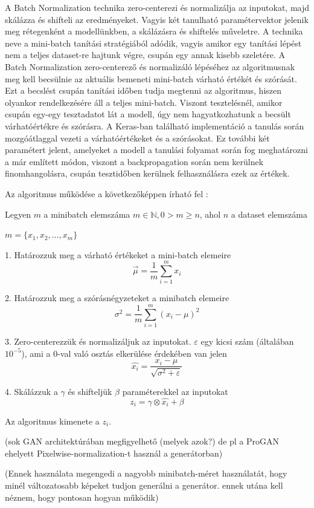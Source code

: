 A Batch Normalization technika zero-centerezi és normalizálja az inputokat, majd skálázza és shifteli az eredményeket. Vagyis két tanulható paramétervektor jelenik meg rétegenként a modellünkben, a skálázásra és shiftelés műveletre. A technika neve a mini-batch tanítási stratégiából adódik, vagyis amikor egy tanítási lépést nem a teljes dataset-re hajtunk végre, csupán egy annak kisebb szeletére. A Batch Normalization zero-centerező és normalizáló lépéséhez az algoritmusnak meg kell becsülnie az aktuális bemeneti mini-batch várható értékét és szórását. Ezt a becslést csupán tanítási időben tudja megtenni az algoritmus, hiszen olyankor rendelkezésére áll a teljes mini-batch. Viszont tesztelésnél, amikor csupán egy-egy tesztadatot lát a modell, úgy nem hagyatkozhatunk a becsült várhatóértékre és szórásra. A Keras-ban található implementáció a tanulás során mozgóátlaggal vezeti a várhatóértékeket és a szórásokat. Ez további két paramétert jelent, amelyeket a modell a tanulási folyamat során fog meghatározni a már említett módon, viszont a backpropagation során nem kerülnek finomhangolásra, csupán tesztidőben kerülnek felhasználásra ezek az értékek.

Az algoritmus működése a következőképpen írható fel \cite{geron2019hands}:

Legyen $m$ a minibatch elemszáma $m \in \mathbb{N}, 0 > m \ge n$, ahol $n$ a dataset elemszáma

$m = \{x_1, x_2, \ldots, x_m \}$ 

1. Határozzuk meg a várható értékeket a mini-batch elemeire
$$ \vec{\mu} = \frac{1}{m} \sum_{i=1}^{m} x_i $$

2. Határozzuk meg a szórásnégyzeteket a minibatch elemeire
$$ \sigma^2 = \frac{1}{m} \sum_{i=1}^{m} (x_i - \mu)^2 $$

3. Zero-centerezzük és normalizáljuk az inputokat. $\varepsilon$ egy kicsi szám (általában $10^{-5}$), ami a 0-val való osztás elkerülése érdekében van jelen
$$ \hat{x_i} = \frac{x_i - \mu}{\sqrt{\sigma^2 + \varepsilon}} $$

4. Skálázzuk a $\gamma$ és shifteljük $\beta$ paraméterekkel az inputokat
$$ z_i = \gamma \otimes \hat{x_i} + \beta$$

Az algoritmus kimenete a $z_i$.

(sok GAN architektúrában megfigyelhető (melyek azok?) de pl a ProGAN ehelyett Pixelwise-normalization-t használ a generátorban)

\cite{miyato2018spectral}
(Ennek használata megengedi a nagyobb minibatch-méret használatát, hogy minél változatosabb képeket tudjon generálni a generátor. ennek utána kell néznem, hogy pontosan hogyan működik)

